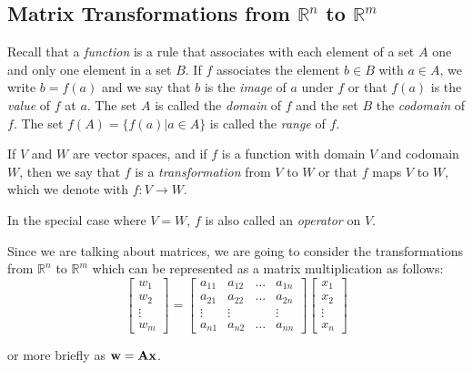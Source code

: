 \documentclass{report}
\begin{document}
	\subsection{Matrix Transformations from $\mathbb{R}^n$ to $\mathbb{R}^m$}
	
		Recall that a \emph{function} is a rule that associates with each element of a set $A$ one and only one element in a set $B$. If $f$ associates the element $b \in B$ with $a \in A$, we write $b=f(a)$ and we say that $b$ is the \emph{image} of $a$ under $f$ or that $f(a)$ is the \emph{value} of $f$ at $a$. The set $A$ is called the \emph{domain} of $f$ and the set $B$ the \emph{codomain} of $f$. The set $f(A)=\{f(a)|a \in A\}$ is called the \emph{range} of $f$.
		
		\begin{defn}[Transformation]
			If $V$ and $W$ are vector spaces, and if $f$ is a function with domain $V$ and codomain $W$, then we say that $f$ is a \emph{transformation} from $V$ to $W$ or that $f$ maps $V$ to $W$, which we denote with $f:V \rightarrow W$.
			
			In the special case where $V=W$, $f$ is also called an \emph{operator} on $V$.
		\end{defn}
		
		Since we are talking about matrices, we are going to consider the transformations from $\mathbb{R}^n$ to $\mathbb{R}^m$ which can be represented as a matrix multiplication as follows:
		\begin{displaymath}
			\begin{bmatrix}
				w_1 \\ w_2 \\ \vdots \\ w_m
			\end{bmatrix}
			=
			\begin{bmatrix}
				a_{11} & a_{12} & \dots & a_{1n} \\
				a_{21} & a_{22} & \dots & a_{2n} \\
				\vdots & \vdots &       & \vdots \\
				a_{n1} & a_{n2} & \dots & a_{nn}
			\end{bmatrix}
			\begin{bmatrix}
				x_1 \\ x_2 \\ \vdots \\ x_n
			\end{bmatrix}
		\end{displaymath}
		
		or more briefly as $\bf{w}=A\bf{x}$.
		
\end{document}

